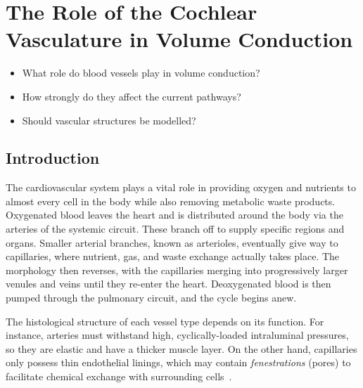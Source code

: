 	\pagestyle{fancy}
	\chead{}
	\rhead{{\sffamily \MakeUppercase\rightmark}}
	\lfoot{}
	\cfoot{{\sffamily \thepage}}
	\rfoot{}
	
\chapter{The Role of the Cochlear Vasculature in Volume Conduction}
\label{sect:vascular_structure}

\begin{center}
	\begin{tcolorbox}[title=\boxtitle]
		\begin{itemize}[leftmargin=*,labelindent=2ex,labelsep=1.5ex,itemsep=0pt,parsep=0pt]
			\item What role do blood vessels play in volume conduction?
			\item How strongly do they affect the current pathways?
			\item Should vascular structures be modelled?
		\end{itemize}
	\end{tcolorbox}
\end{center}


\section{Introduction}

The cardiovascular system plays a vital role in providing oxygen and nutrients
to almost every cell in the body while also removing metabolic waste products.
Oxygenated blood leaves the heart and is distributed around the body via the
arteries of the systemic circuit. These branch off to supply specific regions
and organs. Smaller arterial branches, known as arterioles, eventually give way
to capillaries, where nutrient, gas, and waste exchange actually takes place.
The morphology then reverses, with the capillaries merging into progressively
larger venules and veins until they re-enter the heart. Deoxygenated blood is
then pumped through the pulmonary circuit, and the cycle begins anew.

The histological structure of each vessel type depends on its function. For
instance, arteries must withstand high, cyclically-loaded intraluminal
pressures, so they are elastic and have a thicker muscle layer. On the other
hand, capillaries only possess thin endothelial linings, which may contain
\emph{fenestrations} (pores) to facilitate chemical exchange with surrounding
cells~\cite{martini2006,mondy2009thesis}.

